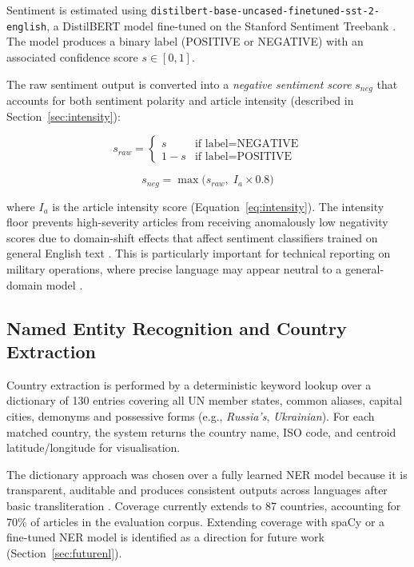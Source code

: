 \documentclass[12pt,a4paper]{report}
\begin{document}
Sentiment is estimated using
\texttt{distilbert-base-uncased-finetuned-sst-2-english}, a DistilBERT
model fine-tuned on the Stanford Sentiment Treebank \cite{devlin2019}.
The model produces a binary label (POSITIVE or NEGATIVE) with an
associated confidence score $s \in [0, 1]$.

The raw sentiment output is converted into a \emph{negative sentiment
score} $s_{neg}$ that accounts for both sentiment polarity and article
intensity (described in Section~\ref{sec:intensity}):

\begin{equation}
  s_{raw} =
  \begin{cases}
    s         & \text{if label} = \text{NEGATIVE} \\
    1 - s     & \text{if label} = \text{POSITIVE}
  \end{cases}
\end{equation}

\begin{equation}
  s_{neg} = \max\!\bigl(s_{raw},\; I_a \times 0.8\bigr)
  \label{eq:neg_score}
\end{equation}

\noindent where $I_a$ is the article intensity score
(Equation~\ref{eq:intensity}). The intensity floor prevents high-severity
articles from receiving anomalously low negativity scores due to
domain-shift effects that affect sentiment classifiers trained on
general English text \cite{loughran2011}. This is particularly important
for technical reporting on military operations, where precise language
may appear neutral to a general-domain model \cite{araci2019}.

\subsection{Named Entity Recognition and Country Extraction}
\label{sec:ner}

Country extraction is performed by a deterministic keyword lookup over a
dictionary of 130 entries covering all UN member states, common aliases,
capital cities, demonyms and possessive forms (e.g., \emph{Russia's},
\emph{Ukrainian}). For each matched country, the system returns the
country name, ISO code, and centroid latitude/longitude for visualisation.

The dictionary approach was chosen over a fully learned NER model because
it is transparent, auditable and produces consistent outputs across
languages after basic transliteration \cite{leetaru2013}. Coverage
currently extends to 87 countries, accounting for 70\% of articles in
the evaluation corpus. Extending coverage with spaCy or a fine-tuned NER
model is identified as a direction for future work
(Section~\ref{sec:futurenl}).
\end{document}
